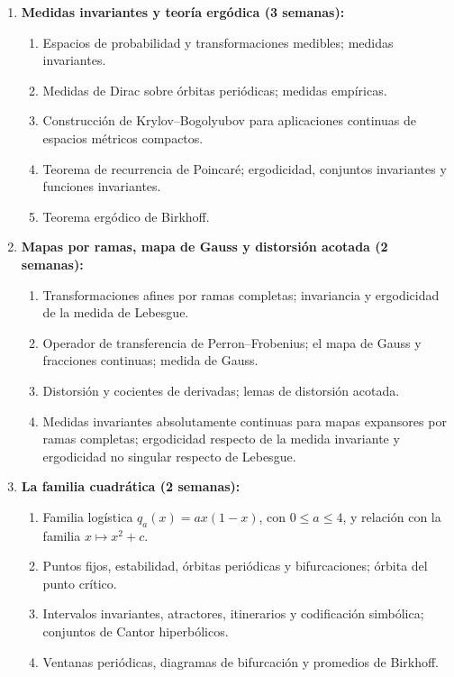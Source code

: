 \begin{refsection}
\begin{enumerate}
\item \textbf{Medidas invariantes y teoría ergódica (3 semanas):}
\begin{enumerate}
    \item Espacios de probabilidad y transformaciones medibles; medidas invariantes.
    \item Medidas de Dirac sobre órbitas periódicas; medidas empíricas.
    \item Construcción de Krylov--Bogolyubov para aplicaciones continuas de espacios métricos compactos.
    \item Teorema de recurrencia de Poincaré; ergodicidad, conjuntos invariantes y funciones invariantes.
    \item Teorema ergódico de Birkhoff.
\end{enumerate}

\item \textbf{Mapas por ramas, mapa de Gauss y distorsión acotada (2 semanas):}
\begin{enumerate}
    \item Transformaciones afines por ramas completas; invariancia y ergodicidad de la medida de Lebesgue.
    \item Operador de transferencia de Perron--Frobenius; el mapa de Gauss y fracciones continuas; medida de Gauss.
    \item Distorsión y cocientes de derivadas; lemas de distorsión acotada.
    \item Medidas invariantes absolutamente continuas para mapas expansores por ramas completas; ergodicidad respecto de la medida invariante y ergodicidad no singular respecto de Lebesgue.
\end{enumerate}

\item \textbf{La familia cuadrática (2 semanas):}
\begin{enumerate}
    \item Familia logística $q_a(x)=ax(1-x)$, con $0\leq a\leq4$, y relación con la familia $x\mapsto x^2+c$.
    \item Puntos fijos, estabilidad, órbitas periódicas y bifurcaciones; órbita del punto crítico.
    \item Intervalos invariantes, atractores, itinerarios y codificación simbólica; conjuntos de Cantor hiperbólicos.
    \item Ventanas periódicas, diagramas de bifurcación y promedios de Birkhoff.
\end{enumerate}
\end{enumerate}


\end{refsection}
